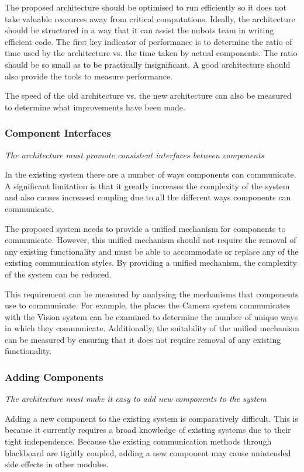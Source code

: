 \documentclass[english,12pt]{scrartcl}
\newcommand{\requirement}[1]{\textit{#1}}
\begin{document}
				The proposed architecture should be optimised to run efficiently so it does not take valuable resources away from critical computations.
				Ideally, the architecture should be structured in a way that it can assist the \gls{nubots} team in writing efficient code.
				The first key indicator of performance is to determine the ratio of time used by the architecture vs. the time taken by actual components.
				The ratio should be so small as to be practically insignificant. A good architecture should also provide the tools to measure performance.
	
				The speed of the old architecture vs. the new architecture can also be measured to determine what improvements have been made.

			\subsubsection{Component Interfaces}
				\requirement{The architecture must promote consistent interfaces between components}
	
				In the existing system there are a number of ways components can communicate.
				A significant limitation is that it greatly increases the complexity of the system and also causes increased coupling due to all the different ways components can communicate.
	
				The proposed system needs to provide a unified mechanism for components to communicate.
				However, this unified mechanism should not require the removal of any existing functionality and must be able to accommodate or replace any of the existing communication styles.
				By providing a unified mechanism, the complexity of the system can be reduced.
	
				This requirement can be measured by analysing the mechanisms that components use to communicate.
				For example, the places the Camera system communicates with the Vision system can be examined to determine the number of unique ways in which they communicate.
				Additionally, the suitability of the unified mechanism can be measured by ensuring that it does not require removal of any existing functionality.

			\subsubsection{Adding Components}
				\requirement{The architecture must make it easy to add new components to the system}
	
				Adding a new component to the existing system is comparatively difficult.
				This is because it currently requires a broad knowledge of existing systems due to their tight independence.
				Because the existing communication methods through blackboard are tightly coupled, adding a new component may cause unintended side effects in other modules.
	
\end{document}
